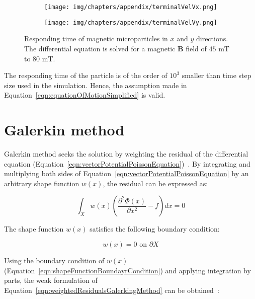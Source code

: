 \begin{figure}[htb]
        \centering
        \begin{subfigure}[b]{0.48\textwidth}
                \texttt{[image: img/chapters/appendix/terminalVelVx.png]}
                \caption{}
                \label{fig:respondingTimeVx}
        \end{subfigure}
        \hfill
        \begin{subfigure}[b]{0.48\textwidth}
                \texttt{[image: img/chapters/appendix/terminalVelVy.png]}
                \caption{}
                \label{fig:respondingTimeVy}
        \end{subfigure}
        \caption[Responding time of magnetic microparticles]{Responding time of magnetic microparticles in $x$ and $y$ directions. The differential equation is solved for a magnetic $\mathbf{B}$ field of $45$ mT to $80$ mT.}
        \label{fig:respondingTime}
\end{figure}

The responding time of the particle is of the order of $10^{3}$ smaller than time step size used in the simulation. Hence, the assumption made in Equation~\ref{eqn:equationOfMotionSimplified} is valid.

\cleardoublepage

\chapter{Galerkin method}\label{sec:galerkinMethod}
Galerkin method seeks the solution by weighting the residual of the differential equation (Equation~\ref{eqn:vectorPotentialPoissonEquation})~\cite{Jin2014}. By integrating and multiplying both sides of Equation~\ref{eqn:vectorPotentialPoissonEquation} by an arbitrary shape function $w(x)$, the residual can be expressed as:

\begin{equation}
	\int_{X}w(x)\left(\frac{\partial^{2} \Phi(x)}{\partial x^{2}} - f\right)dx = 0
	\label{eqn:weightedResidualsGalerkingMethod}
\end{equation}

The shape function $w(x)$ satisfies the following boundary condition:

\begin{equation}
	w(x) =  0 \text{ on } \partial X
	\label{eqn:shapeFunctionBoundayrCondition}
\end{equation}

Using the boundary condition of $w(x)$ (Equation~\ref{eqn:shapeFunctionBoundayrCondition}) and applying integration by parts, the weak formulation of Equation~\ref{eqn:weightedResidualsGalerkingMethod} can be obtained~\cite{Ciarlet1978,Brenner2008,Oden2012}:

